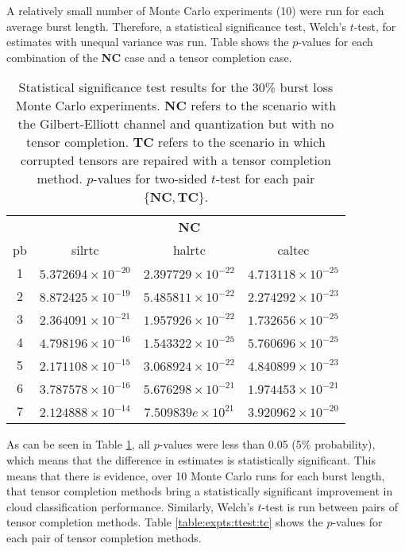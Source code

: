A relatively small number of Monte Carlo experiments (10) were run for each average burst length. Therefore, a statistical significance test, Welch's $t$-test, for estimates with unequal variance was run.  Table shows the $p$-values for each combination of the \textbf{NC} case and a tensor completion case.

\begin{table}[H]
	\caption[Statistical significance results for the 30\% burst loss scenario with no tensor completion]{Statistical significance test results for the 30\% burst loss Monte Carlo experiments. \textbf{NC} refers to the scenario with the Gilbert-Elliott channel and quantization but with no tensor completion. \textbf{TC} refers to the scenario in which corrupted tensors are repaired with a tensor completion method. $p$-values for two-sided $t$-test for each pair $\{\textbf{NC},\textbf{TC}\}$.} \label{table:expts:ttest:gc}
	\centering
	\begin{adjustbox}{max width = \textwidth}
		\begin{tabular}{|c|c|c|c|}
			\hline
			\multicolumn{1}{|c|}{} &
			\multicolumn{3}{c|}{\textbf{NC}} \\
			\gls{pb} &  \gls{silrtc} &  \gls{halrtc} &  \gls{caltec} \\
			\hline \hline 
			1 &  $5.372694 \times 10^{-20}$ &  $2.397729 \times 10^{-22}$ &  $4.713118 \times 10^{-25}$ \\
			2 &  $8.872425 \times 10^{-19}$ &  $5.485811 \times 10^{-22}$ &  $2.274292 \times 10^{-23}$ \\
			3 &  $2.364091 \times 10^{-21}$ &  $1.957926 \times 10^{-22}$ &  $1.732656 \times 10^{-25}$ \\
			4 &  $4.798196 \times 10^{-16}$ & $1.543322 \times 10^{-25}$ &  $5.760696 \times 10^ {-25}$ \\
			5 &  $2.171108 \times 10^{-15}$ &  $3.068924 \times 10^{-22}$ &  $4.840899 \times 10^{-23}$ \\
			6 &  $3.787578 \times 10^{-16}$ &  $5.676298 \times 10^{-21}$ &  $1.974453 \times 10^{-21}$ \\
			7 &  $2.124888 \times 10^{-14}$ &  $7.509839e \times 10^{21}$ &  $3.920962 \times 10^{-20}$ \\
			\hline
		\end{tabular}%
		\end{adjustbox}
\end{table}

As can be seen in Table \ref{table:expts:ttest:gc}, all $p$-values were less than 0.05 (5\% probability), which means that the difference in estimates is statistically significant. This means that there is evidence, over 10 Monte Carlo runs for each burst length, that tensor completion methods bring a statistically significant improvement in cloud classification performance. Similarly, Welch's $t$-test is run between pairs of tensor completion methods. Table \ref{table:expts:ttest:tc} shows the $p$-values for each pair of tensor completion methods.

